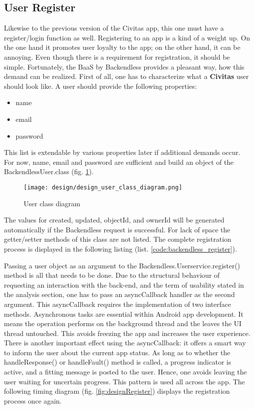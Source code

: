 \subsection{User Register}
Likewise to the previous version of the Civitas app, this one must have a register/login function as well. Registering to an app is a kind of a weight up. On the one hand it promotes user loyalty to the app; on the other hand, it can be annoying. Even though there is a requirement for registration, it should be simple.
Fortunately, the BaaS by Backendless provides a pleasant way, how this demand can be realized. First of all, one has to characterize what a \textbf{Civitas} user should look like. A user should provide the following properties:
\begin{itemize}
\item name
\item email
\item password
\end{itemize}
This list is extendable by various properties later if additional demands occur. For now, name, email and password are sufficient and build an object of the BackendlessUser.class (fig. \ref{fig:design_user_class_diagram}). 

\begin{figure}[H]
	\centering \texttt{[image: design/design\_user\_class\_diagram.png]}
	\caption{User class diagram}
	\label{fig:design_user_class_diagram}
\end{figure}

The values for created, updated, objectId, and ownerId will be generated automatically if the Backendless request is successful. For lack of space the getter/setter methods of this class are not listed. The complete registration process is displayed in the following listing (list. \ref{code:backendless_register}).

\fbox{

}

Passing a user object as an argument to the Backendless.Userservice.register() method is all that needs to be done. Due to the structural behaviour of requesting an interaction with the back-end, and the term of usability stated in the analysis section, one has to pass an asyncCallback handler as the second argument. This asyncCallback requires the implementation of two interface methods. Asynchronous tasks are essential within Android app development. It means the operation performs on the background thread and the leaves the UI thread untouched. This avoids freezing the app and increases the user experience. There is another important effect using the asyncCallback: it offers a smart way to inform the user about the current app status. As long as to whether the handleResponse() or handleFault() method is called, a progress indicator is active, and a fitting message is posted to the user. Hence, one avoids leaving the user waiting for uncertain progress. This pattern is used all across the app.
The following timing diagram (fig. \ref{fig:designRegister}) displays the registration process once again.


